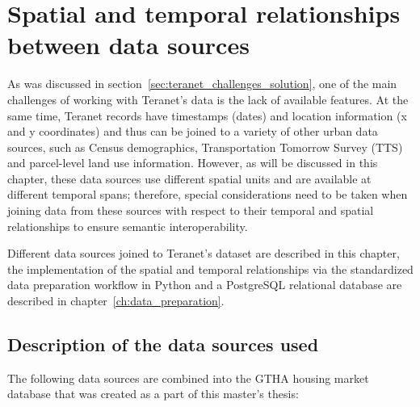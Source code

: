 \chapter{Spatial and temporal relationships between data sources} \label{ch:spatial_and_temporal_relationships}

As was discussed in section~\ref{sec:teranet_challenges_solution}, one of the main challenges of working with Teranet's data is the lack of available features.
At the same time, Teranet records have timestamps (dates) and location information (x and y coordinates) and thus can be joined to a variety of other urban data sources, such as Census demographics, Transportation Tomorrow Survey (TTS) and parcel-level land use information.
However, as will be discussed in this chapter, these data sources use different spatial units and are available at different temporal spans;
therefore, special considerations need to be taken when joining data from these sources with respect to their temporal and spatial relationships to ensure semantic interoperability.

Different data sources joined to Teranet's dataset are described in this chapter, the implementation of the spatial and temporal relationships via the standardized data preparation workflow in Python and a PostgreSQL relational database are described in chapter~\ref{ch:data_preparation}.

\section{Description of the data sources used} \label{sec:description_of_data_sources}

The following data sources are combined into the GTHA housing market database that was created as a part of this master's thesis:

